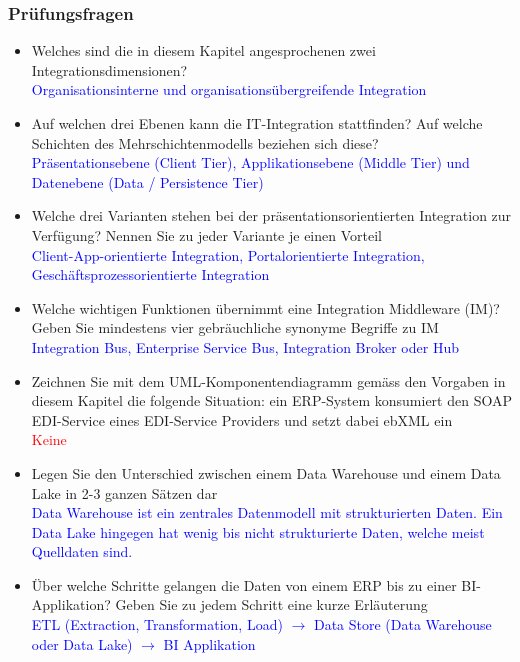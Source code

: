 \vfill\null
\columnbreak

\subsubsection{Prüfungsfragen}

\begin{itemize}
    \item Welches sind die in diesem Kapitel angesprochenen zwei Integrationsdimensionen? \\
    \textcolor{blue}{Organisationsinterne und organisationsübergreifende Integration}
    \item Auf welchen drei Ebenen kann die IT-Integration stattfinden? Auf welche Schichten
    des Mehrschichtenmodells beziehen sich diese? \\
    \textcolor{blue}{Präsentationsebene (Client Tier), Applikationsebene (Middle Tier) und Datenebene (Data / Persistence Tier)}
    \item Welche drei Varianten stehen bei der präsentationsorientierten
    Integration zur Verfügung? Nennen Sie zu jeder Variante je einen Vorteil \\
    \textcolor{blue}{Client-App-orientierte Integration, Portalorientierte Integration, Geschäftsprozessorientierte Integration}
    \item Welche wichtigen Funktionen übernimmt eine Integration Middleware (IM)? Geben Sie mindestens vier gebräuchliche synonyme Begriffe zu IM \\
    \textcolor{blue}{Integration Bus, Enterprise Service Bus, Integration Broker oder Hub}
    \item Zeichnen Sie mit dem UML-Komponentendiagramm gemäss den Vorgaben in diesem Kapitel die folgende Situation: ein ERP-System konsumiert den SOAP EDI-Service eines EDI-Service Providers und setzt dabei ebXML ein \\
    \textcolor{red}{Keine}
    \item Legen Sie den Unterschied zwischen einem Data Warehouse und einem Data Lake in 2-3 ganzen Sätzen dar \\
    \textcolor{blue}{Data Warehouse ist ein zentrales Datenmodell mit strukturierten Daten. Ein Data Lake hingegen hat wenig bis nicht strukturierte Daten, welche meist Quelldaten sind.}
    \item Über welche Schritte gelangen die Daten von einem ERP bis zu einer BI-Applikation? Geben Sie zu jedem Schritt eine kurze Erläuterung \\
    \textcolor{blue}{ETL (Extraction, Transformation, Load) $\rightarrow$ Data Store (Data Warehouse oder Data Lake) $\rightarrow$ BI Applikation}
\end{itemize}
